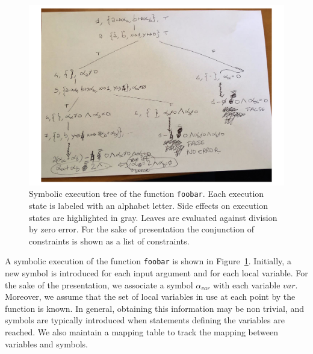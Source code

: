 \begin{figure}[t]
  \centering
  \includegraphics[width=1.0\columnwidth]{images/photo_tree} 
  \caption{Symbolic execution tree of the function {\tt foobar}. Each execution state is labeled with an alphabet letter. Side effects on execution states are highlighted in gray. Leaves are evaluated against division by zero error. For the sake of presentation the conjunction of constraints is shown as a list of constraints. }
  \label{fig:example-symbolic-execution}
\end{figure}

A symbolic execution of the function {\tt foobar} is shown in Figure~\ref{fig:example-symbolic-execution}. Initially, a new symbol is introduced for each input argument and for each local variable. For the sake of the presentation, we associate a symbol $\alpha_{var}$ with each variable $var$. 
Moreover, we assume that the set of local variables in use at each point by the function is known. In general, obtaining this information may be non trivial, and symbols are typically introduced when statements defining the variables are reached.
We also maintain a mapping table to track the mapping between variables and symbols. 

